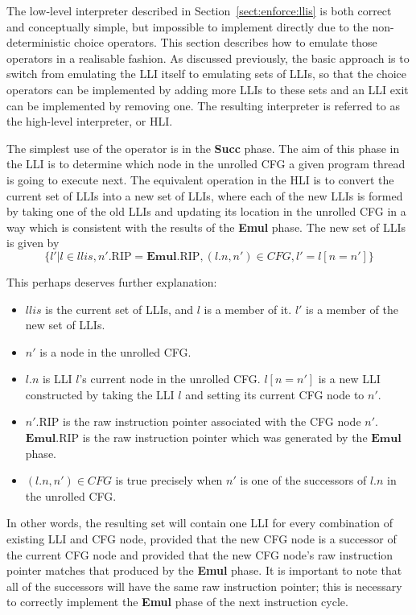 The low-level interpreter described in Section~\ref{sect:enforce:llis}
is both correct and conceptually simple, but impossible to implement
directly due to the non-deterministic choice operators.  This section
describes how to emulate those operators in a realisable fashion.  As
discussed previously, the basic approach is to switch from emulating
the LLI itself to emulating sets of LLIs, so that the choice operators
can be implemented by adding more LLIs to these sets and an LLI exit
can be implemented by removing one.  The resulting interpreter is
referred to as the high-level interpreter, or HLI.

The simplest use of the operator is in the \textbf{Succ} phase.  The
aim of this phase in the LLI is to determine which node in the
unrolled CFG a given program thread is going to execute next.  The
equivalent operation in the HLI is to convert the current set of LLIs
into a new set of LLIs, where each of the new LLIs is formed by taking
one of the old LLIs and updating its location in the unrolled CFG in a
way which is consistent with the results of the \textbf{Emul} phase.
The new set of LLIs is given by
\begin{displaymath}
\{l' | l \in \mathit{llis}, n'.\mathrm{RIP} = \mathbf{Emul}.\mathrm{RIP}, (l.n, n') \in \mathit{CFG}, l' = l[n = n'] \}
\end{displaymath}

This perhaps deserves further explanation:

\begin{itemize}
\item $\mathit{llis}$ is the current set of LLIs, and $l$ is a member of it.
  $l'$ is a member of the new set of LLIs.
\item $n'$ is a node in the unrolled CFG.
\item $l.n$ is LLI $l$'s current node in the unrolled CFG.  $l[n =
  n']$ is a new LLI constructed by taking the LLI $l$ and setting its
  current CFG node to $n'$.
\item $n'.\mathrm{RIP}$ is the raw instruction pointer associated with
  the CFG node $n'$.  $\mathbf{Emul}.\mathrm{RIP}$ is the raw
  instruction pointer which was generated by the $\mathbf{Emul}$
  phase.
\item $(l.n, n') \in \mathit{CFG}$ is true precisely when $n'$ is one
  of the successors of $l.n$ in the unrolled CFG.
\end{itemize}

In other words, the resulting set will contain one LLI for every
combination of existing LLI and CFG node, provided that the new CFG
node is a successor of the current CFG node and provided that the new
CFG node's raw instruction pointer matches that produced by the
\textbf{Emul} phase.  It is important to note that all of the
successors will have the same raw instruction pointer; this is
necessary to correctly implement the \textbf{Emul} phase of the next
instruction cycle.

